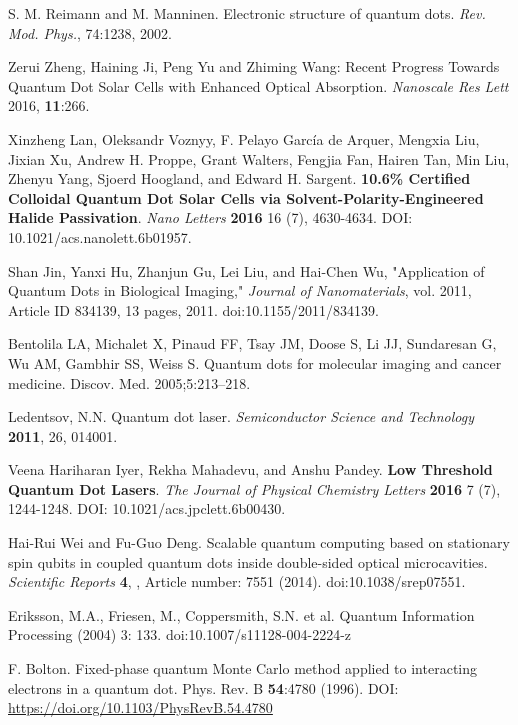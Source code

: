 \documentclass[../main.tex]{subfiles}
\begin{document}
\begin{thebibliography}{99}

 S. M. Reimann and M. Manninen. Electronic structure of quantum dots. \emph{Rev. Mod.
Phys.}, 74:1238, 2002.

 Zerui Zheng, Haining Ji, Peng Yu and Zhiming Wang: Recent Progress Towards Quantum Dot Solar Cells with Enhanced Optical Absorption. \emph{Nanoscale Res Lett} 2016, \textbf{11}:266.

 Xinzheng Lan, Oleksandr Voznyy, F. Pelayo García de Arquer, Mengxia Liu, Jixian Xu, Andrew H. Proppe, Grant Walters, Fengjia Fan, Hairen Tan, Min Liu, Zhenyu Yang, Sjoerd Hoogland, and Edward H. Sargent. \textbf{10.6\% Certified Colloidal Quantum Dot Solar Cells via Solvent-Polarity-Engineered Halide Passivation}. \emph{Nano Letters} \textbf{2016} 16 (7), 4630-4634. DOI: 10.1021/acs.nanolett.6b01957.

 Shan Jin, Yanxi Hu, Zhanjun Gu, Lei Liu, and Hai-Chen Wu, "Application of Quantum Dots in Biological Imaging," \emph{Journal of Nanomaterials}, vol. 2011, Article ID 834139, 13 pages, 2011. doi:10.1155/2011/834139.

 Bentolila LA, Michalet X, Pinaud FF, Tsay JM, Doose S, Li JJ, Sundaresan G, Wu AM, Gambhir SS, Weiss S. Quantum dots for molecular imaging and cancer medicine. Discov. Med. 2005;5:213–218.

 Ledentsov, N.N. Quantum dot laser. \emph{Semiconductor Science and Technology} \textbf{2011}, 26, 014001.

 Veena Hariharan Iyer, Rekha Mahadevu, and Anshu Pandey. \textbf{Low Threshold Quantum Dot Lasers}. \emph{The Journal of Physical Chemistry Letters} \textbf{2016} 7 (7), 1244-1248. DOI: 10.1021/acs.jpclett.6b00430.

 Hai-Rui Wei and Fu-Guo Deng. Scalable quantum computing based on stationary spin qubits in coupled quantum dots inside double-sided optical microcavities. \emph{Scientific Reports} \textbf{4}, , Article number: 7551 (2014). doi:10.1038/srep07551.

 Eriksson, M.A., Friesen, M., Coppersmith, S.N. et al. Quantum Information Processing (2004) 3: 133. doi:10.1007/s11128-004-2224-z

 F. Bolton. Fixed-phase quantum Monte Carlo method applied to interacting electrons in
a quantum dot. Phys. Rev. B \textbf{54}:4780 (1996). DOI: \url{https://doi.org/10.1103/PhysRevB.54.4780}


\end{thebibliography}
\end{document}

